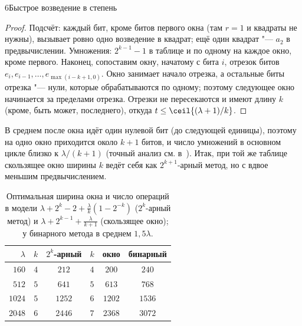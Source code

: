 \begin{lecture}{6}{Быстрое возведение в степень}
\begin{proof}
Подсчёт: каждый бит, кроме битов первого окна (там $r = 1$ и квадраты не нужны), вызывает ровно
одно возведение в квадрат; ещё один квадрат "--- $a_2$ в предвычислении. Умножения: $2^{k-1} - 1$
в таблице и по одному на каждое окно, кроме первого. Наконец, сопоставим окну, начатому
с бита $i$, отрезок битов $e_i, e_{i-1}, \dots, e_{\max(i-k+1, 0)}$. Окно занимает начало
отрезка, а остальные биты отрезка "--- нули, которые обрабатываются по одному; поэтому следующее
окно начинается за пределами отрезка. Отрезки не пересекаются и имеют длину $k$ (кроме,
быть может, последнего), откуда $t \le \ceil{(\lambda+1)/k}$.
\end{proof}

В среднем после окна идёт один нулевой бит (до следующей единицы), поэтому на одно окно
приходится около $k + 1$ битов, и число умножений в основном цикле близко к $\lambda/(k + 1)$
(точный анализ см. в~\cite[разд.~4.6.3]{knuth-taocp2}). Итак, при той же таблице
скользящее окно ширины $k$ ведёт себя как $2^{k+1}$-арный метод, но с вдвое меньшим
предвычислением.

\begin{table}[ht]
\centering
\caption{Оптимальная ширина окна и число операций в модели
$\lambda + 2^k - 2 + \frac{\lambda}{k}(1 - 2^{-k})$ ($2^k$-арный метод) и
$\lambda + 2^{k-1} + \frac{\lambda}{k+1}$ (скользящее окно); у бинарного метода в среднем
$1{,}5\lambda$.}\label{l6:tab-k}
\begin{tabular}{r|cc|cc|c}
  $\lambda$ & $k$ & $2^k$-арный & $k$ & окно & бинарный \\ \hline
  $160$ & $4$ & $212$ & $4$ & $200$ & $240$ \\
  $512$ & $5$ & $641$ & $5$ & $613$ & $768$ \\
  $1024$ & $5$ & $1252$ & $6$ & $1202$ & $1536$ \\
  $2048$ & $6$ & $2446$ & $7$ & $2368$ & $3072$
\end{tabular}
\end{table}


\end{lecture}
